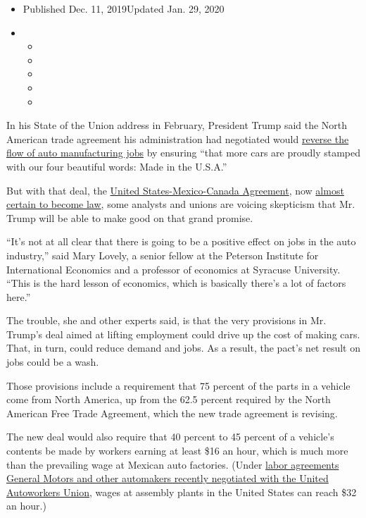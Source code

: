 \begin{itemize}
\item
  Published Dec. 11, 2019Updated Jan. 29, 2020
\item
  \begin{itemize}
  \item
  \item
  \item
  \item
  \item
  \end{itemize}
\end{itemize}

In his State of the Union address in February, President Trump said the
North American trade agreement his administration had negotiated would
\href{https://www.nytimes.com/2019/02/06/business/nafta-trump-deal.html}{reverse
the flow of auto manufacturing jobs} by ensuring ``that more cars are
proudly stamped with our four beautiful words: Made in the U.S.A.''

But with that deal, the
\href{https://www.nytimes.com/2020/01/29/business/economy/usmca-deal.html}{United
States-Mexico-Canada Agreement}, now
\href{https://www.nytimes.com/2019/12/10/us/politics/usmca-trade-deal.html}{almost
certain to become law}, some analysts and unions are voicing skepticism
that Mr. Trump will be able to make good on that grand promise.

``It's not at all clear that there is going to be a positive effect on
jobs in the auto industry,'' said Mary Lovely, a senior fellow at the
Peterson Institute for International Economics and a professor of
economics at Syracuse University. ``This is the hard lesson of
economics, which is basically there's a lot of factors here.''

The trouble, she and other experts said, is that the very provisions in
Mr. Trump's deal aimed at lifting employment could drive up the cost of
making cars. That, in turn, could reduce demand and jobs. As a result,
the pact's net result on jobs could be a wash.

Those provisions include a requirement that 75 percent of the parts in a
vehicle come from North America, up from the 62.5 percent required by
the North American Free Trade Agreement, which the new trade agreement
is revising.

The new deal would also require that 40 percent to 45 percent of a
vehicle's contents be made by workers earning at least \$16 an hour,
which is much more than the prevailing wage at Mexican auto factories.
(Under
\href{https://www.nytimes.com/2019/10/25/business/gm-contract.html}{labor
agreements General Motors and other automakers recently negotiated with
the United Autoworkers Union}, wages at assembly plants in the United
States can reach \$32 an hour.)

